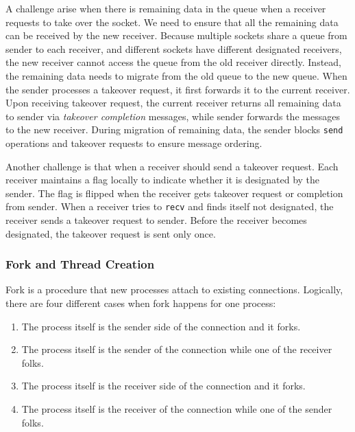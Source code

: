 A challenge arise when there is remaining data in the queue when a receiver requests to take over the socket. We need to ensure that all the remaining data can be received by the new receiver. Because multiple sockets share a queue from sender to each receiver, and different sockets have different designated receivers, the new receiver cannot access the queue from the old receiver directly. Instead, the remaining data needs to migrate from the old queue to the new queue. When the sender processes a takeover request, it first forwards it to the current receiver. Upon receiving takeover request, the current receiver returns all remaining data to sender via \textit{takeover completion} messages, while sender forwards the messages to the new receiver. During migration of remaining data, the sender blocks \texttt{send} operations and takeover requests to ensure message ordering.

Another challenge is that when a receiver should send a takeover request. Each receiver maintains a flag locally to indicate whether it is designated by the sender. The flag is flipped when the receiver gets takeover request or completion from sender. When a receiver tries to \texttt{recv} and finds itself not designated, the receiver sends a takeover request to sender. Before the receiver becomes designated, the takeover request is sent only once.


\subsubsection{Fork and Thread Creation}
\label{subsubsec:fork_fork}

Fork is a procedure that new processes attach to existing connections. Logically, there are four different cases when fork happens for one process:
\begin{enumerate}
	\item The process itself is the sender side of the connection and it forks.
	\item The process itself is the sender of the connection while one of the receiver folks.
	\item The process itself is the receiver side of the connection and it forks.
	\item The process itself is the receiver of the connection while one of the sender folks.
\end{enumerate}

